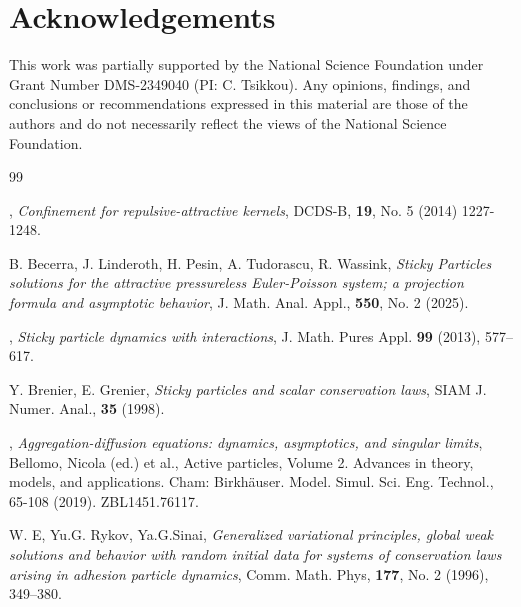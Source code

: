 \documentclass[11pt]{article}
\numberwithin{equation}{section}
\begin{document}
\section{Acknowledgements}
This work was partially supported by the National Science Foundation under Grant Number DMS-2349040 (PI: C. Tsikkou).
	Any opinions, findings, and conclusions or recommendations expressed in this
material are those of the authors and do not necessarily reflect the views of the National Science Foundation.

%
%

\begin{thebibliography}{99}

, {\em Confinement for repulsive-attractive kernels}, DCDS-B, \textbf{19}, No. 5 (2014) 1227-1248.

 {\sc B. Becerra, J. Linderoth, H. Pesin, A. Tudorascu, R. Wassink}, {\em Sticky Particles solutions for the attractive pressureless Euler-Poisson system; a projection formula and asymptotic behavior}, J. Math. Anal. Appl., \textbf{550}, No. 2 (2025).

,
   \emph{Sticky particle dynamics with interactions}, J. Math. Pures Appl.
   \textbf{99} (2013), 577--617.

{\sc Y. Brenier, E. Grenier},
{\em Sticky particles and scalar conservation laws}, SIAM J. Numer. Anal., \textbf{35} (1998). 

, {\em Aggregation-diffusion equations: dynamics, asymptotics, and singular limits}, Bellomo, Nicola (ed.) et al., Active particles, Volume 2. Advances in theory, models, and applications. Cham: Birkhäuser. Model. Simul. Sci. Eng. Technol., 65-108 (2019). ZBL1451.76117.


{\sc W. E, Yu.G. Rykov, Ya.G.Sinai}, {\em Generalized variational principles, global weak solutions and behavior with random initial data for systems of conservation laws arising in adhesion particle dynamics}, 
Comm. Math. Phys, \textbf{177}, No. 2 (1996), 349--380.


\end{thebibliography}
\end{document}
